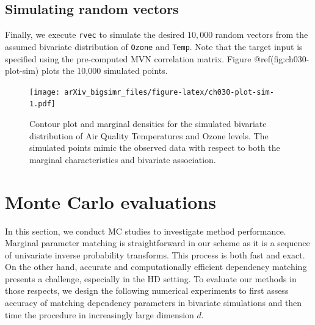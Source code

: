 \documentclass{article}
\newenvironment{Shaded}{\begin{snugshade}}{\end{snugshade}}
\newcommand{\DecValTok}[1]{\textcolor[rgb]{0.00,0.00,0.81}{#1}}
\newcommand{\FunctionTok}[1]{\textcolor[rgb]{0.00,0.00,0.00}{#1}}
\newcommand{\NormalTok}[1]{#1}
\newcommand{\OtherTok}[1]{\textcolor[rgb]{0.56,0.35,0.01}{#1}}
\newcommand{\SpecialCharTok}[1]{\textcolor[rgb]{0.00,0.00,0.00}{#1}}
\begin{document}
\hypertarget{simulating-random-vectors}{%
\subsection{Simulating random vectors}\label{simulating-random-vectors}}

Finally, we execute \texttt{rvec} to simulate the desired \(10,000\)
random vectors from the assumed bivariate distribution of \texttt{Ozone}
and \texttt{Temp}. Note that the target input is specified using the
pre-computed MVN correlation matrix. Figure @ref(fig:ch030-plot-sim)
plots the 10,000 simulated points.

\begin{Shaded}
\end{Shaded}

\begin{figure}
\centering
\texttt{[image: arXiv\_bigsimr\_files/figure-latex/ch030-plot-sim-1.pdf]}
\caption{Contour plot and marginal densities for the simulated bivariate
distribution of Air Quality Temperatures and Ozone levels. The simulated
points mimic the observed data with respect to both the marginal
characteristics and bivariate association.}
\end{figure}

\hypertarget{simulations}{%
\section{Monte Carlo evaluations}\label{simulations}}

In this section, we conduct MC studies to investigate method
performance. Marginal parameter matching is straightforward in our
scheme as it is a sequence of univariate inverse probability transforms.
This process is both fast and exact. On the other hand, accurate and
computationally efficient dependency matching presents a challenge,
especially in the HD setting. To evaluate our methods in those respects,
we design the following numerical experiments to first assess accuracy
of matching dependency parameters in bivariate simulations and then time
the procedure in increasingly large dimension \(d\).
\end{document}
